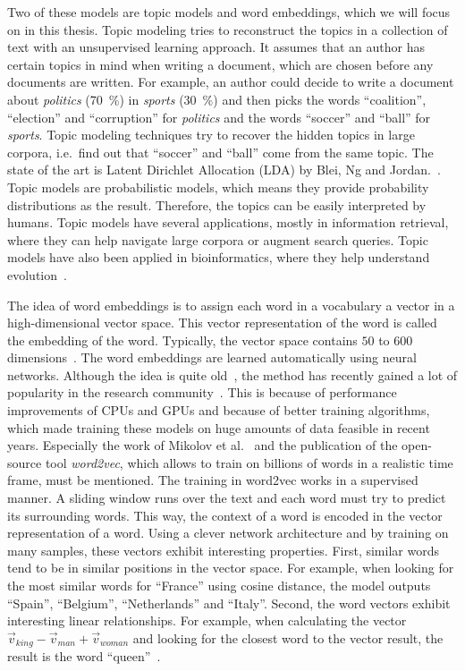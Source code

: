 \documentclass[
        a4paper,
        titlepage,
        twoside,
        parskip,
        numbers=noenddot
        ]{scrbook}
\theoremstyle{break}
\begin{document}
Two of these models are topic models and word embeddings, which we will focus on in this thesis.
Topic modeling tries to reconstruct the topics in a collection of text with an unsupervised learning approach.
It assumes that an author has certain topics in mind when writing a document, which are chosen before any documents are written.
For example, an author could decide to write a document about \emph{politics} (70~\%) in \emph{sports} (30~\%) and then picks the words ``coalition'', ``election'' and ``corruption'' for \emph{politics} and the words ``soccer'' and ``ball'' for \emph{sports}.
Topic modeling techniques try to recover the hidden topics in large corpora, i.e.\ find out that ``soccer'' and ``ball'' come from the same topic.
The state of the art is Latent Dirichlet Allocation (LDA) by Blei, Ng and Jordan.~\cite{Blei2003}.
Topic models are probabilistic models, which means they provide probability distributions as the result.
Therefore, the topics can be easily interpreted by humans.
Topic models have several applications, mostly in information retrieval, where they can help navigate large corpora or augment search queries.
Topic models have also been applied in bioinformatics, where they help understand evolution~\cite{Pritchard2000}.

The idea of word embeddings is to assign each word in a vocabulary a vector in a high-dimensional vector space.
This vector representation of the word is called the embedding of the word.
Typically, the vector space contains $50$ to $600$ dimensions~\cite{Mikolov2013}.
The word embeddings are learned automatically using neural networks.
Although the idea is quite old~\cite{Bengio2003,Rumelhart1988}, the method has recently gained a lot of popularity in the research community~\cite{Levy2014,Levy2014a,Mikolov2013b}.
This is because of performance improvements of CPUs and GPUs and because of better training algorithms, which made training these models on huge amounts of data feasible in recent years.
Especially the work of Mikolov et al.~\cite{Mikolov2013b,Mikolov2013,Mikolov2013a} and the publication of the open-source tool \emph{word2vec}, which allows to train on billions of words in a realistic time frame, must be mentioned.
The training in word2vec works in a supervised manner.
A sliding window runs over the text and each word must try to predict its surrounding words.
This way, the context of a word is encoded in the vector representation of a word.
Using a clever network architecture and by training on many samples, these vectors exhibit interesting properties.
First, similar words tend to be in similar positions in the vector space.
For example, when looking for the most similar words for ``France'' using cosine distance, the model outputs ``Spain'', ``Belgium'', ``Netherlands'' and ``Italy''.
Second, the word vectors exhibit interesting linear relationships.
For example, when calculating the vector $\vec{v}_{king} - \vec{v}_{man} + \vec{v}_{woman}$ and looking for the closest word to the vector result, the result is the word ``queen''~\cite{Mikolov2013b}.
\end{document}
